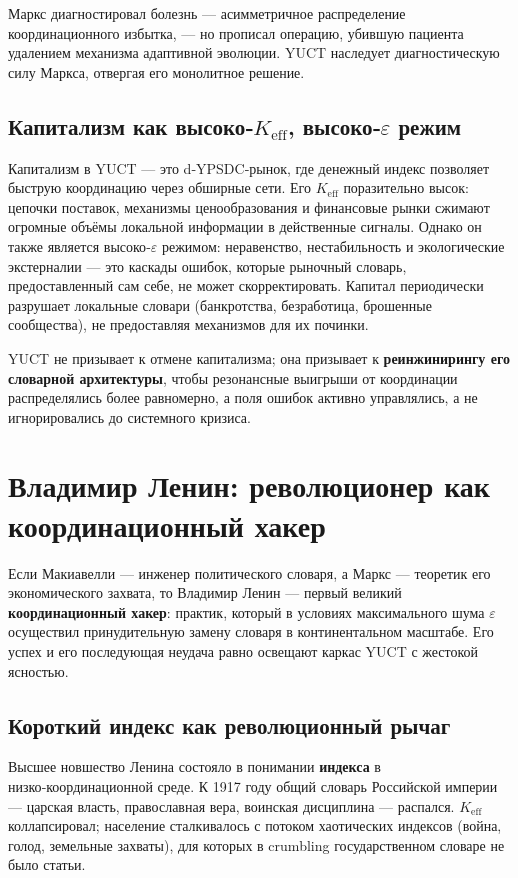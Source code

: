 \documentclass[12pt,a4paper]{article}
\begin{document}
	Маркс диагностировал болезнь — асимметричное распределение координационного избытка, — но прописал операцию, убившую пациента удалением механизма адаптивной эволюции. YUCT наследует диагностическую силу Маркса, отвергая его монолитное решение.
	
	\subsection{Капитализм как высоко‑\(K_{\mathrm{eff}}\), высоко‑\(\varepsilon\) режим}
	
	Капитализм в YUCT — это d‑YPSDC‑рынок, где денежный индекс позволяет быструю координацию через обширные сети. Его \(K_{\mathrm{eff}}\) поразительно высок: цепочки поставок, механизмы ценообразования и финансовые рынки сжимают огромные объёмы локальной информации в действенные сигналы. Однако он также является высоко‑\(\varepsilon\) режимом: неравенство, нестабильность и экологические экстерналии — это каскады ошибок, которые рыночный словарь, предоставленный сам себе, не может скорректировать. Капитал периодически разрушает локальные словари (банкротства, безработица, брошенные сообщества), не предоставляя механизмов для их починки.
	
	YUCT не призывает к отмене капитализма; она призывает к \textbf{реинжинирингу его словарной архитектуры}, чтобы резонансные выигрыши от координации распределялись более равномерно, а поля ошибок активно управлялись, а не игнорировались до системного кризиса.
	
	\section{Владимир Ленин: революционер как координационный хакер}
	\label{sec:lenin}
	
	Если Макиавелли — инженер политического словаря, а Маркс — теоретик его экономического захвата, то Владимир Ленин — первый великий \textbf{координационный хакер}: практик, который в условиях максимального шума \(\varepsilon\) осуществил принудительную замену словаря в континентальном масштабе. Его успех и его последующая неудача равно освещают каркас YUCT с жестокой ясностью.
	
	\subsection{Короткий индекс как революционный рычаг}
	
	Высшее новшество Ленина состояло в понимании \textbf{индекса} в низко‑координационной среде. К 1917 году общий словарь Российской империи — царская власть, православная вера, воинская дисциплина — распался. \(K_{\mathrm{eff}}\) коллапсировал; население сталкивалось с потоком хаотических индексов (война, голод, земельные захваты), для которых в crumbling государственном словаре не было статьи.
	
\end{document}

